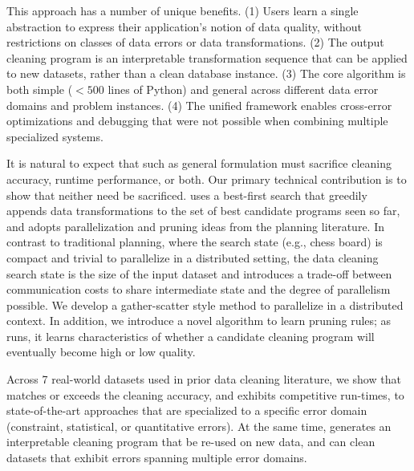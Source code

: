 This approach has a number of unique benefits. (1) Users learn a single abstraction to express their application's notion of data quality, without restrictions on classes of data errors or data transformations.  (2) The output cleaning program is an interpretable transformation sequence that can be applied to new datasets, rather than a clean database instance. (3) The core algorithm is both simple ($<500$ lines of Python) and general across different data error domains and problem instances.  (4) The unified framework enables cross-error optimizations and debugging that were not possible when combining multiple specialized systems.

It is natural to expect that such as general formulation must sacrifice cleaning accuracy, runtime performance, or both.  Our primary technical contribution is to show that neither need be sacrificed.  \sys uses a best-first search that greedily appends data transformations to the set of best candidate programs seen so far, and adopts parallelization and pruning ideas from the planning literature.  In contrast to traditional planning, where the search state (e.g., chess board) is compact and trivial to parallelize in a distributed setting, the data cleaning search state is the size of the input dataset and introduces a trade-off between communication costs to share intermediate state and the degree of parallelism possible.  We develop a gather-scatter style method to parallelize \sys in a distributed context.  In addition, we introduce a novel algorithm to learn pruning rules; as \sys runs, it learns characteristics of whether a candidate cleaning program will eventually become high or low quality.  

Across 7 real-world datasets used in prior data cleaning literature, we show that \sys matches or exceeds the cleaning accuracy, and exhibits competitive run-times, to state-of-the-art approaches that are specialized to a specific error domain (constraint, statistical, or quantitative errors).  At the same time, \sys generates an interpretable cleaning program that be re-used on new data, and can clean datasets that exhibit errors spanning multiple error domains. 




